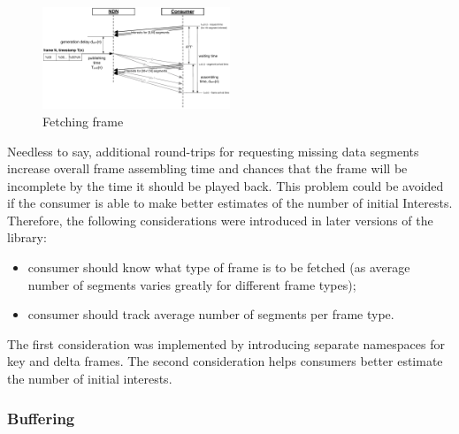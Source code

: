 \documentclass{icn/sig-alternate-2012} %
\begin{document}
\begin{figure}[t!]
\centering
\includegraphics[width=0.5\textwidth]{frame-fetch}
\vspace{-18pt}
\caption{Fetching frame}
\label{fig:pull}
\end{figure}

Needless to say, additional round-trips for requesting missing data segments increase overall frame assembling time and chances that the frame will be incomplete by the time it should be played back. This problem could be avoided if the consumer is able to make better estimates of the number of initial Interests. Therefore, the following considerations were introduced in later versions of the library:
\begin{itemize}
\item consumer should know what type of frame is to be fetched (as average number of segments varies greatly for different frame types);
\item consumer should track average number of segments per frame type.
\end{itemize}

The first consideration was implemented by introducing separate namespaces for key and delta frames. The second consideration helps consumers better estimate the number of initial interests.

\subsubsection{Buffering}

\end{document}
